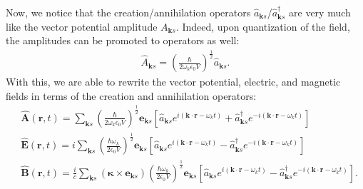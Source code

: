 \documentclass{book}
\theoremstyle{definition}
\newcommand{\f}[2]{\frac{#1}{#2}}
\newcommand{\lp}{\left(}
\newcommand{\rp}{\right)}
\newcommand{\lb}{\left[}
\newcommand{\rb}{\right]}
\begin{document}
Now, we notice that the creation/annihilation operators $\hat{a}_{\mathbf{k}s}$/$\hat{a}^\dagger_{\mathbf{k}s}$ are very much like the vector potential amplitude $A_{\mathbf{k}s}$. Indeed, upon quantization of the field, the amplitudes can be promoted to operators as well:
\begin{align}
\hat{A}_{\mathbf{k}s} = \lp \f{\hbar}{2\omega_k \epsilon_0 V} \rp^{\f{1}{2}}\hat{a}_{\mathbf{k}s}.
\end{align}
With this, we are able to rewrite the vector potential, electric, and magnetic fields in terms of the creation and annihilation operators:
\begin{align}
&\hat{\mathbf{A}}(\mathbf{r},t) = \sum_{\mathbf{k}s}\lp\f{\hbar}{2\omega_k \epsilon_0 V}\rp^{\f{1}{2}} \mathbf{e}_{\mathbf{k}s} \lb \hat{a}_{\mathbf{k}s}e^{i(\mathbf{k}\cdot\mathbf{r} - \omega_k t)}
+ \hat{a}^\dagger_{\mathbf{k}s}e^{-i(\mathbf{k}\cdot\mathbf{r} - \omega_k t)}  \rb\\
&\hat{\mathbf{E}}(\mathbf{r},t) = i\sum_{\mathbf{k}s}\lp\f{\hbar\omega_k}{2\epsilon_0 V}\rp^{\f{1}{2}} \mathbf{e}_{\mathbf{k}s} \lb \hat{a}_{\mathbf{k}s}e^{i(\mathbf{k}\cdot\mathbf{r} - \omega_k t)}
- \hat{a}^\dagger_{\mathbf{k}s}e^{-i(\mathbf{k}\cdot\mathbf{r} - \omega_k t)}  \rb\\
&\hat{\mathbf{B}}(\mathbf{r},t) = \f{i}{c}\sum_{\mathbf{k}s} (\mathbf{\kappa} \times \mathbf{e}_{\mathbf{k}s})\lp\f{\hbar\omega_k}{2 \epsilon_0 V}\rp^{\f{1}{2}} \mathbf{e}_{\mathbf{k}s} \lb \hat{a}_{\mathbf{k}s}e^{i(\mathbf{k}\cdot\mathbf{r} - \omega_k t)}
- \hat{a}^\dagger_{\mathbf{k}s}e^{-i(\mathbf{k}\cdot\mathbf{r} - \omega_k t)}  \rb.
\end{align}
\end{document}
